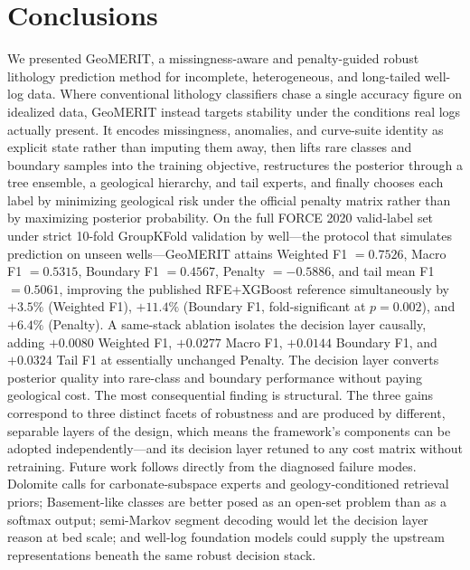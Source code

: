 \documentclass[bdcc,article,submit,pdftex,moreauthors]{Definitions/mdpi}
\begin{document}
\section{Conclusions}
\label{sec:conclusion}
We presented GeoMERIT, a missingness-aware and penalty-guided robust lithology prediction
method for incomplete, heterogeneous, and long-tailed well-log data. Where conventional
lithology classifiers chase a single accuracy figure on idealized data, GeoMERIT instead
targets stability under the conditions real logs actually present. It encodes missingness,
anomalies, and curve-suite identity as explicit state rather than imputing them away, then
lifts rare classes and boundary samples into the training objective, restructures the posterior
through a tree ensemble, a geological hierarchy, and tail experts, and finally chooses each
label by minimizing geological risk under the official penalty matrix rather than by maximizing
posterior probability. On the full FORCE 2020 valid-label set under strict
10-fold GroupKFold validation by well---the protocol that simulates prediction on unseen
wells---GeoMERIT attains Weighted F1 $=0.7526$, Macro F1 $=0.5315$, Boundary F1 $=0.4567$,
Penalty $=-0.5886$, and tail mean F1 $=0.5061$, improving the published RFE+XGBoost
reference simultaneously by $+3.5\%$ (Weighted F1), $+11.4\%$ (Boundary F1, fold-significant
at $p=0.002$), and $+6.4\%$ (Penalty). A same-stack ablation isolates the decision layer
causally, adding $+0.0080$ Weighted F1, $+0.0277$ Macro F1, $+0.0144$ Boundary F1, and $+0.0324$
Tail F1 at essentially unchanged Penalty. The decision layer converts posterior quality
into rare-class and boundary performance without paying geological cost. The most
consequential finding is structural. The three gains correspond to three distinct facets of
robustness and are produced by different, separable layers of the design, which means the
framework's components can be adopted independently---and its decision layer retuned to any
cost matrix without retraining. Future work follows directly from the diagnosed failure
modes. Dolomite calls for carbonate-subspace experts and geology-conditioned retrieval priors;
Basement-like classes are better posed as an open-set problem than as a softmax output;
semi-Markov segment decoding would let the decision layer reason at bed scale; and well-log
foundation models could supply the upstream representations beneath the same robust decision
stack.

\vspace{6pt}

\end{document}
